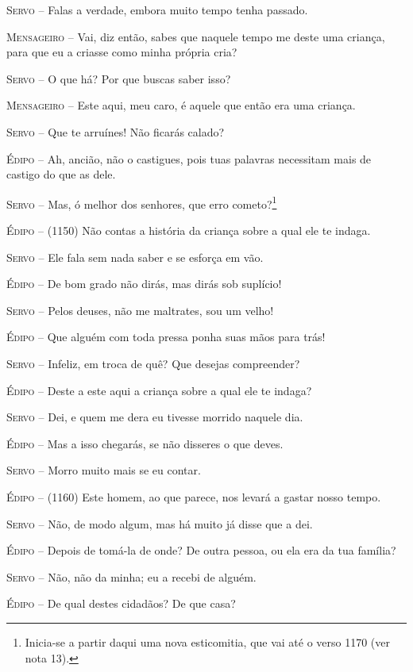 \textsc{Servo} --   Falas a verdade, embora muito tempo tenha passado.

\textsc{Mensageiro} --   Vai, diz então, sabes que naquele tempo me deste uma criança, para que
eu a criasse como minha própria cria?

\textsc{Servo} --   O que há? Por que buscas saber isso?

\textsc{Mensageiro} --   Este aqui, meu caro, é aquele que então era uma criança.

\textsc{Servo} --   Que te arruínes! Não ficarás calado?

\textsc{Édipo} --   Ah, ancião, não o castigues, pois tuas palavras necessitam mais de
castigo do que as dele.

\textsc{Servo} --   Mas, ó melhor dos senhores, que erro cometo?\footnote{Inicia-se a partir daqui uma nova esticomitia,
  que vai até o verso 1170 (ver nota 13).}

\textsc{Édipo} --   (1150) Não contas a história da criança sobre a qual ele te indaga.

\textsc{Servo} --   Ele fala sem nada saber e se esforça em vão.

\textsc{Édipo} --   De bom grado não dirás, mas dirás sob suplício!

\textsc{Servo} --   Pelos deuses, não me maltrates, sou um velho!

\textsc{Édipo} --   Que alguém com toda pressa ponha suas mãos para trás!

\textsc{Servo} --   Infeliz, em troca de quê? Que desejas compreender?

\textsc{Édipo} --   Deste a este aqui a criança sobre a qual ele te indaga?

\textsc{Servo} --   Dei, e quem me dera eu tivesse morrido naquele dia.

\textsc{Édipo} --   Mas a isso chegarás, se não disseres o que deves.

\textsc{Servo} --   Morro muito mais se eu contar.

\textsc{Édipo} --   (1160) Este homem, ao que parece, nos levará a gastar nosso tempo.

\textsc{Servo} --   Não, de modo algum, mas há muito já disse que a dei.

\textsc{Édipo} --   Depois de tomá-la de onde? De outra pessoa, ou ela era da tua família?

\textsc{Servo} --   Não, não da minha; eu a recebi de alguém.

\textsc{Édipo} --   De qual destes cidadãos? De que casa?

